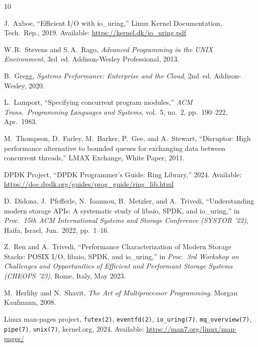 \documentclass[10pt,conference]{IEEEtran}
\begin{document}
\begin{thebibliography}{10}

J.~Axboe,
``Efficient I/O with io\_uring,''
Linux Kernel Documentation, Tech.\ Rep., 2019.
Available: \url{https://kernel.dk/io_uring.pdf}

W.\,R.~Stevens and S.\,A.~Rago,
\textit{Advanced Programming in the UNIX Environment}, 3rd~ed.
Addison-Wesley Professional, 2013.

B.~Gregg,
\textit{Systems Performance: Enterprise and the Cloud}, 2nd~ed.
Addison-Wesley, 2020.

L.~Lamport,
``Specifying concurrent program modules,''
\textit{ACM Trans.\ Programming Languages and Systems},
vol.~5, no.~2, pp.~190--222, Apr.\ 1983.

M.~Thompson, D.~Farley, M.~Barker, P.~Gee, and A.~Stewart,
``Disruptor: High performance alternative to bounded queues for exchanging
data between concurrent threads,''
LMAX Exchange, White Paper, 2011.

DPDK Project,
``DPDK Programmer's Guide: Ring Library,'' 2024.
Available: \url{https://doc.dpdk.org/guides/prog_guide/ring_lib.html}

D.~Didona, J.~Pfefferle, N.~Ioannou, B.~Metzler, and A.~Trivedi,
``Understanding modern storage APIs: A systematic study of libaio, SPDK,
and io\_uring,''
in \textit{Proc.\ 15th ACM International Systems and Storage Conference (SYSTOR '22)},
Haifa, Israel, Jun.\ 2022, pp.~1--16.

Z.~Ren and A.~Trivedi,
``Performance Characterization of Modern Storage Stacks: POSIX I/O, libaio, SPDK, and io\_uring,''
in \textit{Proc.\ 3rd Workshop on Challenges and Opportunities of Efficient and Performant Storage Systems (CHEOPS '23)},
Rome, Italy, May 2023.

M.~Herlihy and N.~Shavit,
\textit{The Art of Multiprocessor Programming}.
Morgan Kaufmann, 2008.

Linux man-pages project,
\texttt{futex(2)}, \texttt{eventfd(2)}, \texttt{io\_uring(7)},
\texttt{mq\_overview(7)}, \texttt{pipe(7)}, \texttt{unix(7)},
kernel.org, 2024.
Available: \url{https://man7.org/linux/man-pages/}

\end{thebibliography}
\end{document}
